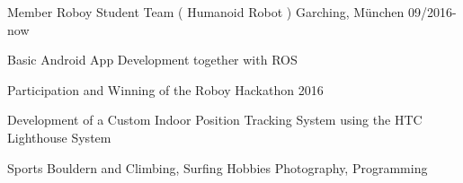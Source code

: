 
\begin{cventries}
    \cventry
    {Member} %
    {Roboy Student Team ( Humanoid Robot ) } %
    {Garching, München} %
    {09/2016- now} %
    {
        \begin{cvitems} %
        \item {Basic Android App Development together with ROS}        
        \item {Participation and Winning of the Roboy Hackathon 2016}        
        \item {Development of a Custom Indoor Position Tracking System using the HTC Lighthouse System}        
        \end{cvitems}
    }


\end{cventries}


 \begin{cvskills}
     \cvskill
     {Sports} %
     {}
     {Bouldern and Climbing, Surfing} %
     \cvskill
     {Hobbies}
     {}
     {Photography, Programming}
 \end{cvskills}

